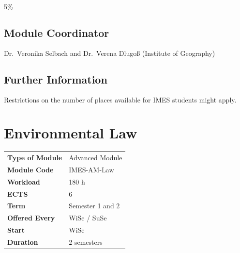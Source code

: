 \documentclass[
  letterpaper,
  10pt,
  openany]{book}
\begin{document}

5\%

\section*{Module Coordinator}\label{module-coordinator-1}


Dr.~Veronika Selbach and Dr.~Verena Dlugoß (Institute of Geography)

\section*{Further Information}\label{further-information-1}


Restrictions on the number of places available for IMES students might
apply.

\chapter*{Environmental Law}\label{environmental-law}


\begin{longtable}[]{@{}ll@{}}
\toprule\noalign{}
\endhead
\bottomrule\noalign{}
\endlastfoot
\textbf{Type of Module} & Advanced Module \\
\textbf{Module Code} & IMES-AM-Law \\
\textbf{Workload} & 180 h \\
\textbf{ECTS} & 6 \\
\textbf{Term} & Semester 1 and 2 \\
\textbf{Offered Every} & WiSe / SuSe \\
\textbf{Start} & WiSe \\
\textbf{Duration} & 2 semesters \\
\end{longtable}
\end{document}
